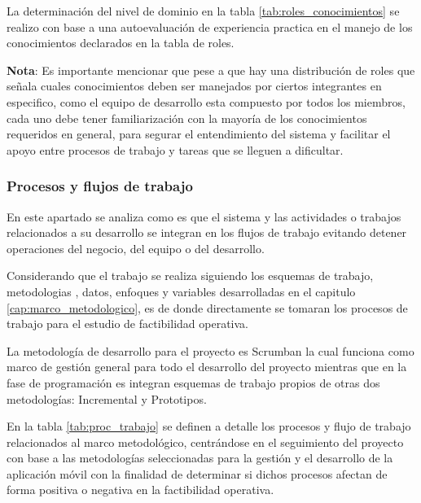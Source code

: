 La determinación del nivel de dominio en la tabla \ref{tab:roles_conocimientos} se realizo con base a una autoevaluación de experiencia practica en el manejo de los conocimientos declarados en la tabla de roles.

\textbf{Nota}: Es importante mencionar que pese a que hay una distribución de roles que señala cuales conocimientos deben ser manejados por ciertos integrantes en especifico, como el equipo de desarrollo esta compuesto por todos los miembros, cada uno debe tener familiarización con la mayoría de los conocimientos requeridos en general, para segurar el entendimiento del sistema y facilitar el apoyo entre procesos de trabajo y tareas que se lleguen a dificultar.

\subsubsection{Procesos y flujos de trabajo}

En este apartado se analiza como es que el sistema y las actividades o trabajos relacionados a su desarrollo se integran en los flujos de trabajo evitando detener operaciones del negocio, del equipo o del desarrollo. 

Considerando que el trabajo se realiza siguiendo los esquemas de trabajo, metodologias , datos, enfoques y variables desarrolladas en el capitulo \ref{cap:marco_metodologico}, es de donde directamente se tomaran los procesos de trabajo para el estudio de factibilidad operativa. 

La metodología de desarrollo para el proyecto es Scrumban la cual funciona como marco de gestión general para todo el desarrollo del proyecto mientras que en la fase de programación es integran esquemas de trabajo propios de otras dos metodologías: Incremental y Prototipos. 

En la tabla \ref{tab:proc_trabajo} se definen a detalle los procesos y flujo de trabajo relacionados al marco metodológico, centrándose en el seguimiento del proyecto con base a las metodologías seleccionadas para la gestión y el desarrollo de la aplicación móvil con la finalidad de determinar si dichos procesos afectan de forma positiva o negativa en la factibilidad operativa. 

